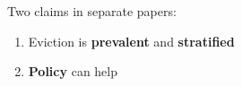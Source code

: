 \documentclass{beamer}
\newcommand\bblue[1]{{\color{blue}\textbf{#1}}}
\begin{document}
\begin{frame}
Two claims in separate papers:
\begin{enumerate}
\item Eviction is \bblue{prevalent} and \bblue{stratified}
\item \bblue{Policy} can help
\end{enumerate}
\end{frame}
\end{document}
